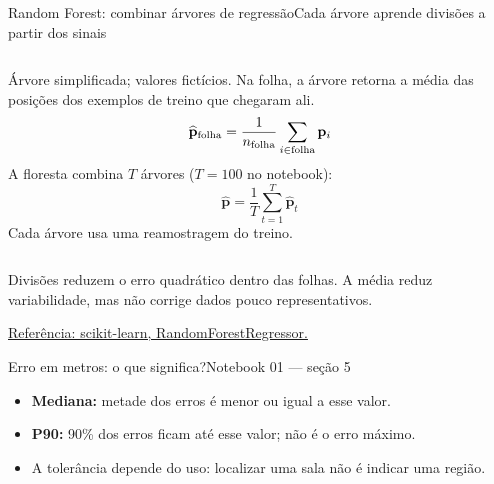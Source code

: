 \documentclass[aspectratio=169,10pt]{beamer}
\begin{document}
\begin{frame}{Random Forest: combinar árvores de regressão}{Cada árvore aprende divisões a partir dos sinais}
\setlength{\abovedisplayskip}{4pt}\setlength{\belowdisplayskip}{4pt}
\setlength{\abovedisplayshortskip}{0pt}\setlength{\belowdisplayshortskip}{0pt}
\begin{columns}[T]
\centering
{}
\par\scriptsize Árvore simplificada; valores fictícios.
\small
Na folha, a árvore retorna a média das posições dos exemplos de treino que chegaram ali.
\[
\widehat{\mathbf p}_{\rm folha}
=\frac{1}{n_{\rm folha}}\sum_{i\in{\rm folha}}\mathbf p_i
\]
A floresta combina $T$ árvores ($T=100$ no notebook):
\[
\widehat{\mathbf p}=\frac{1}{T}\sum_{t=1}^{T}\widehat{\mathbf p}_t
\]
\footnotesize Cada árvore usa uma reamostragem do treino.
\end{columns}
\vspace{2mm}
\small Divisões reduzem o erro quadrático dentro das folhas. A média reduz variabilidade,
mas não corrige dados pouco representativos.
\par\scriptsize \href{https://scikit-learn.org/stable/modules/generated/sklearn.ensemble.RandomForestRegressor.html}{Referência: scikit-learn, RandomForestRegressor.}
\end{frame}

\begin{frame}{Erro em metros: o que significa?}{Notebook 01 — seção 5}
\centering
{}
\vspace{5mm}
\begin{itemize}
\item \textbf{Mediana:} metade dos erros é menor ou igual a esse valor.
\item \textbf{P90:} 90\% dos erros ficam até esse valor; não é o erro máximo.
\item A tolerância depende do uso: localizar uma sala não é indicar uma região.
\end{itemize}
\end{frame}
\end{document}
